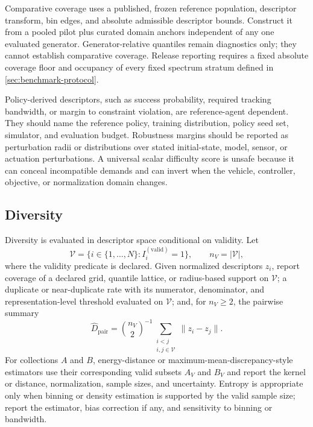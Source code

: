 Comparative coverage uses a published, frozen reference population, descriptor
transform, bin edges, and absolute admissible descriptor bounds. Construct it from a
pooled pilot plus curated domain anchors independent of any one evaluated generator.
Generator-relative quantiles remain diagnostics only; they cannot establish
comparative coverage. Release reporting requires a fixed absolute coverage floor and
occupancy of every fixed spectrum stratum defined in
\cref{sec:benchmark-protocol}.

Policy-derived descriptors, such as success probability, required tracking bandwidth,
or margin to constraint violation, are reference-agent dependent. They should name the
reference policy, training distribution, policy seed set, simulator, and evaluation
budget. Robustness margins should be reported as perturbation radii or distributions
over stated initial-state, model, sensor, or actuation perturbations. A universal
scalar difficulty score is unsafe because it can conceal incompatible demands and can
invert when the vehicle, controller, objective, or normalization domain changes.

\subsection{Diversity}

Diversity is evaluated in descriptor space conditional on validity. Let
\begin{equation}
  \mathcal{V}=\{i\in\{1,\ldots,N\}:I_i^{(\mathrm{valid})}=1\},
  \qquad n_V=|\mathcal{V}|,
  \label{eq:valid-index-set}
\end{equation}
where the validity predicate is declared. Given normalized descriptors $z_i$, report
coverage of a declared grid, quantile lattice, or radius-based support on
$\mathcal{V}$; a duplicate or near-duplicate rate with its numerator, denominator,
and representation-level threshold evaluated on $\mathcal{V}$; and, for $n_V\geq2$,
the pairwise summary
\begin{equation}
  \widehat{D}_{\mathrm{pair}}
  =\binom{n_V}{2}^{-1}\sum_{\substack{i<j\\i,j\in\mathcal{V}}}
  \lVert z_i-z_j\rVert.
  \label{eq:feasible-pairwise-diversity}
\end{equation}
For collections $A$ and $B$, energy-distance or maximum-mean-discrepancy-style
estimators use their corresponding valid subsets $A_V$ and $B_V$ and report the
kernel or distance, normalization, sample sizes, and uncertainty. Entropy is
appropriate only when binning or density estimation is supported by the valid sample
size; report the estimator, bias correction if any, and sensitivity to binning or
bandwidth.

